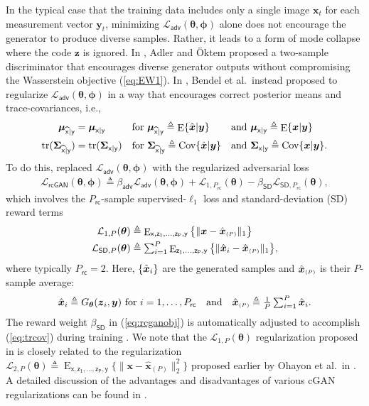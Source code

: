 \documentclass{article}
\theoremstyle{plain}
\theoremstyle{definition}
\theoremstyle{remark}
\renewcommand{\hat}{\widehat}
\newcommand{\defn}{\triangleq}
\newcommand{\hvec}[1]{\ensuremath{\Hat{\boldsymbol{#1}}}}
\renewcommand{\vec}[1]{\ensuremath{\boldsymbol{#1}}}
\newcommand{\mc}[1]{\ensuremath{\mathcal{#1}}}
\DeclareMathOperator{\E}{E}
\DeclareMathOperator{\Cov}{Cov}
\DeclareMathOperator{\tr}{tr}
\renewcommand{\eqref}[1]{(\ref{eq:#1})}
\newcommand{\textr}[1]{\textcolor{red}{#1}}
\newcommand{\train}{_{\mathsf{rc}}}
\newcommand{\Ladv}{\mc{L}_{\mathsf{adv}}}
\newcommand{\Lrcgan}{\mc{L}_{\mathsf{rcGAN}}}
\newcommand{\LoneP}{\mc{L}_{1,P}}
\newcommand{\LonePt}{\mc{L}_{1,P\train}}
\newcommand{\LstdP}{\mc{L}_{\mathsf{SD},P}}
\newcommand{\LstdPt}{\mc{L}_{\mathsf{SD},P\train}}
\newcommand{\betaadv}{\beta_{\mathsf{adv}}}
\newcommand{\betastd}{\beta_{\mathsf{SD}}}
\newcommand{\avgP}{_{\scriptscriptstyle (P)}}
\newcommand{\avgPt}{_{\scriptscriptstyle (P\train)}}
\newcommand{\ExzPy}{\E_{\mathsf{x,z_1,...,z_P,y}}}
\newcommand{\EzPy}{\E_{\mathsf{z_1,...,z_P,y}}}
\newcommand{\muxgy}{\vec{\mu}_{\mathsf{x}|\mathsf{y}}}
\newcommand{\Sigxgy}{\vec{\Sigma}_{\mathsf{x}|\mathsf{y}}}
\newcommand{\muxgyhat}{\vec{\mu}_{\hat{\mathsf{x}}|\mathsf{y}}}
\newcommand{\Sigxgyhat}{\vec{\Sigma}_{\hat{\mathsf{x}}|\mathsf{y}}}
\begin{document}
In the typical case that the training data includes only a single image $\vec{x}_t$ for each measurement vector $\vec{y}_t$, minimizing $\Ladv(\vec{\theta},\vec{\phi})$ alone does not encourage the generator to produce diverse samples.
Rather, it leads to a form of mode collapse where the code $\vec{z}$ is ignored.
In \cite{Adler:18}, Adler and \"Oktem proposed a two-sample discriminator that encourages diverse generator outputs without compromising the Wasserstein objective \eqref{EW1}.
In \cite{Bendel:NIPS:23}, Bendel et al.\ instead proposed to regularize $\Ladv(\vec{\theta},\vec{\phi})$ in a way that encourages correct posterior means and trace-covariances, i.e., 
\begin{align}
\muxgyhat &= \muxgy
&&\text{for}~
\muxgyhat\defn\E\{\hvec{x}|\vec{y}\}
&&\text{and}~
\muxgy\defn\E\{\vec{x}|\vec{y}\}\\
\tr(\Sigxgyhat) &= \tr(\Sigxgy)
&&\text{for}~
\Sigxgyhat\defn\Cov\{\hvec{x}|\vec{y}\}
&&\text{and}~
\Sigxgy\defn\Cov\{\vec{x}|\vec{y}\} 
\label{eq:trcov}.
\end{align}
To do this, \cite{Bendel:NIPS:23} replaced $\Ladv(\vec{\theta},\vec{\phi})$ with the regularized adversarial loss
\begin{align}\textstyle
\Lrcgan(\vec{\theta},\vec{\phi}) \defn \betaadv\Ladv(\vec{\theta},\vec{\phi}) + \LonePt(\vec{\theta}) - \betastd\LstdPt(\vec{\theta})
\label{eq:rcganobj} ,
\end{align}
which involves the $P\train$-sample supervised-$\ell_1$ loss and standard-deviation (SD) reward terms
\begin{align}
\LoneP(\vec{\theta})
&\defn \textstyle \ExzPy\big\{ \|\vec{x}-\hvec{x}\avgP\|_1\big\}
\label{eq:LoneP} \\
\LstdP(\vec{\theta})
&\defn \textstyle \sum_{i=1}^{P} \EzPy\big\{ \|\hvec{x}_i-\hvec{x}\avgP\|_1 \big\}
\label{eq:LstdP},
\end{align}
where typically $P\train=2$.
Here, $\{\hvec{x}_i\}$ are the generated samples and $\hvec{x}\avgP$ is their $P$-sample average:
\begin{align}
\hvec{x}_i \defn G_{\vec{\theta}}(\vec{z}_i,\vec{y}) ~\text{for}~ i=1,\dots,P\train
\quad\text{and}\quad
\hvec{x}\avgP \defn \textstyle \frac{1}{P} \sum_{i=1}^{P} \hvec{x}_i .
\end{align}
The reward weight $\betastd$ in \eqref{rcganobj} is automatically adjusted to accomplish \eqref{trcov} during training \cite{Bendel:NIPS:23}.
We note that the $\mathcal{L}_{1,P}(\vec{\theta})$ regularization proposed in \cite{Bendel:NIPS:23} is closely related to the regularization $\mathcal{L}_{2,P}(\vec{\theta}) \triangleq \ExzPy\{\|\vec{x}-\hat{\vec{x}}_{(P)}\|_2^2\}$ proposed earlier by Ohayon et al.\ in \cite{Ohayon:ICCVW:21}.
A detailed discussion of the advantages and disadvantages of various cGAN regularizations can be found in \cite{Bendel:NIPS:23}. 
\end{document}
